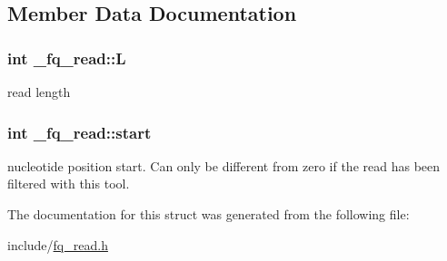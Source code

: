 \subsection{Member Data Documentation}
\hypertarget{struct__fq__read_a746efa9093b5223e85ffb7274e7693ef}{
\subsubsection[{L}]{\setlength{\rightskip}{0pt plus 5cm}int \+\_\+fq\+\_\+read\+::\+L}}\label{struct__fq__read_a746efa9093b5223e85ffb7274e7693ef}
read length \hypertarget{struct__fq__read_a0b8deb6c25c72026b4928b17e3f12ade}{
\subsubsection[{start}]{\setlength{\rightskip}{0pt plus 5cm}int \+\_\+fq\+\_\+read\+::start}}\label{struct__fq__read_a0b8deb6c25c72026b4928b17e3f12ade}
nucleotide position start. Can only be different from zero if the read has been filtered with this tool. 

The documentation for this struct was generated from the following file\+:\begin{DoxyCompactItemize}
\item 
include/\hyperlink{fq__read_8h}{fq\+\_\+read.\+h}\end{DoxyCompactItemize}
